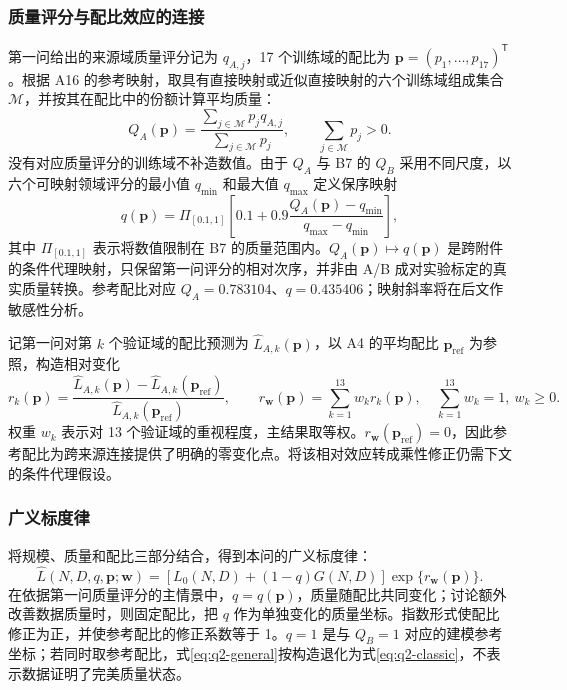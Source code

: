 \subsubsection{质量评分与配比效应的连接}

第一问给出的来源域质量评分记为 $q_{A,j}$，17 个训练域的配比为 $\boldsymbol p=(p_1,\ldots,p_{17})^\mathsf T$。根据 A16 的参考映射，取具有直接映射或近似直接映射的六个训练域组成集合 $\mathcal M$，并按其在配比中的份额计算平均质量：
\begin{equation}
 Q_A(\boldsymbol p)=
 \frac{\sum_{j\in\mathcal M}p_jq_{A,j}}
      {\sum_{j\in\mathcal M}p_j},
 \qquad \sum_{j\in\mathcal M}p_j>0.
 \label{eq:q2-qa}
\end{equation}
没有对应质量评分的训练域不补造数值。由于 $Q_A$ 与 B7 的 $Q_B$ 采用不同尺度，以六个可映射领域评分的最小值 $q_{\min}$ 和最大值 $q_{\max}$ 定义保序映射
\begin{equation}
 q(\boldsymbol p)=\Pi_{[0.1,1]}\!\left[
 0.1+0.9\frac{Q_A(\boldsymbol p)-q_{\min}}
 {q_{\max}-q_{\min}}\right],
 \label{eq:q2-quality-map}
\end{equation}
其中 $\Pi_{[0.1,1]}$ 表示将数值限制在 B7 的质量范围内。$Q_A(\boldsymbol p)\mapsto q(\boldsymbol p)$ 是跨附件的条件代理映射，只保留第一问评分的相对次序，并非由 A/B 成对实验标定的真实质量转换。参考配比对应 $Q_A=0.783104$、$q=0.435406$；映射斜率将在后文作敏感性分析。

记第一问对第 $k$ 个验证域的配比预测为 $\widehat L_{A,k}(\boldsymbol p)$，以 A4 的平均配比 $\boldsymbol p_{\mathrm{ref}}$ 为参照，构造相对变化
\begin{equation}
 r_k(\boldsymbol p)=
 \frac{\widehat L_{A,k}(\boldsymbol p)
       -\widehat L_{A,k}(\boldsymbol p_{\mathrm{ref}})}
      {\widehat L_{A,k}(\boldsymbol p_{\mathrm{ref}})},
 \qquad
 r_{\boldsymbol w}(\boldsymbol p)=\sum_{k=1}^{13}w_kr_k(\boldsymbol p),
 \quad \sum_{k=1}^{13}w_k=1,\ w_k\geqslant0.
 \label{eq:q2-mixture-effect}
\end{equation}
权重 $w_k$ 表示对 13 个验证域的重视程度，主结果取等权。$r_{\boldsymbol w}(\boldsymbol p_{\mathrm{ref}})=0$，因此参考配比为跨来源连接提供了明确的零变化点。将该相对效应转成乘性修正仍需下文的条件代理假设。

\subsubsection{广义标度律}

将规模、质量和配比三部分结合，得到本问的广义标度律：
\begin{equation}
 \boxed{\widehat L(N,D,q,\boldsymbol p;\boldsymbol w)
 =\left[L_0(N,D)+(1-q)G(N,D)\right]
       \exp\!\bigl\{r_{\boldsymbol w}(\boldsymbol p)\bigr\}.}
 \label{eq:q2-general}
\end{equation}
在依据第一问质量评分的主情景中，$q=q(\boldsymbol p)$，质量随配比共同变化；讨论额外改善数据质量时，则固定配比，把 $q$ 作为单独变化的质量坐标。指数形式使配比修正为正，并使参考配比的修正系数等于 1。$q=1$ 是与 $Q_B=1$ 对应的建模参考坐标；若同时取参考配比，式\eqref{eq:q2-general}按构造退化为式\eqref{eq:q2-classic}，不表示数据证明了完美质量状态。

